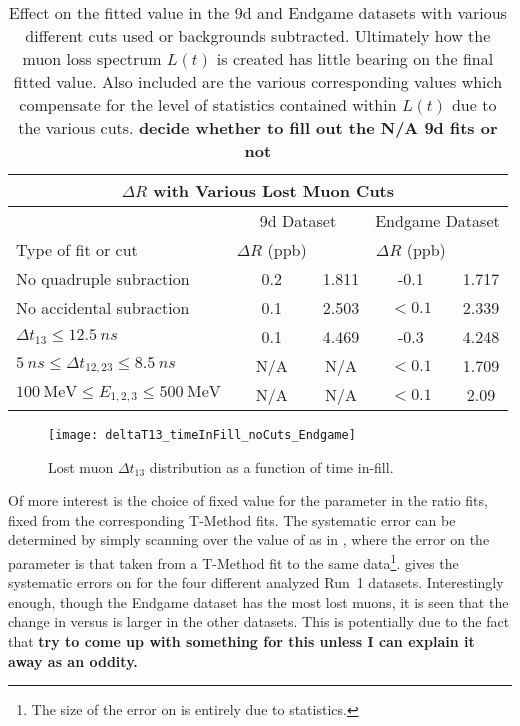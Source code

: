 \begin{table}[]
\centering
\setlength\tabcolsep{10pt}
\renewcommand{\arraystretch}{1.2}
\begin{tabular*}{1\linewidth}{@{\extracolsep{\fill}}lcccc}
  \hline
    \multicolumn{5}{c}{\textbf{$\Delta R$ with Various Lost Muon Cuts}} \\
  \hline\hline
    & \multicolumn{2}{c}{9d Dataset} & \multicolumn{2}{c}{Endgame Dataset} \\
  \hline
    Type of fit or cut & $\Delta R$ (ppb) & \K & $\Delta R$ (ppb) & \K \\
  \hline
    No quadruple subraction & 0.2 & 1.811 & -0.1 & 1.717 \\
    No accidental subraction & 0.1 & 2.503 & $<0.1$ & 2.339 \\
    $\Delta t_{13} \leq \SI{12.5}{ns}$ & 0.1 & 4.469 & -0.3 & 4.248 \\
    $\SI{5}{ns} \leq \Delta t_{12, 23} \leq \SI{8.5}{ns}$ & N/A & N/A & $<0.1$ & 1.709 \\
    $\SI{100}{\MeV} \leq E_{1,2,3} \leq \SI{500}{\MeV}$ & N/A & N/A & $<0.1$ & 2.09 \\
  \hline 
\end{tabular*}
\caption[Effect on fitted R value due to lost muon cuts in the 9d and Endgame datasets]{Effect on the fitted \R value in the 9d and Endgame datasets with various different cuts used or backgrounds subtracted. Ultimately how the muon loss spectrum $L(t)$ is created has little bearing on the final fitted \R value. Also included are the various corresponding \K values which compensate for the level of statistics contained within $L(t)$ due to the various cuts. \textbf{decide whether to fill out the N/A 9d fits or not}}
\label{tab:lostmuonsvariousfits}
\end{table}


\begin{figure}[]
    \centering
    \texttt{[image: deltaT13\_timeInFill\_noCuts\_Endgame]}
    \caption[Lost muon $\Delta t_{13}$ distribution as a function of time in-fill]{Lost muon $\Delta t_{13}$ distribution as a function of time in-fill.}
    \label{fig:deltaT13}
\end{figure}



Of more interest is the choice of fixed value for the \K parameter in the ratio fits, fixed from the corresponding T-Method fits. The systematic error can be determined by simply scanning over the value of \K as in , where the error on the parameter is that taken from a T-Method fit to the same data\footnote{The size of the error on \K is entirely due to statistics.}.  gives the systematic errors on \R for the four different analyzed Run~1 datasets. Interestingly enough, though the Endgame dataset has the most lost muons, it is seen that the change in \R versus \K is larger in the other datasets. This is potentially due to the fact that \textbf{try to come up with something for this unless I can explain it away as an oddity.}



